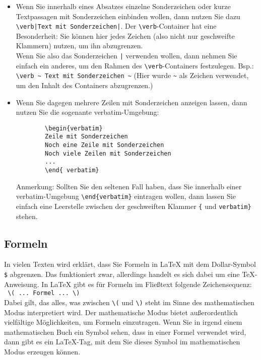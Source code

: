 \begin{itemize}
	\item Wenn Sie innerhalb eines Absatzes einzelne Sonderzeichen oder kurze Textpassagen mit Sonderzeichen einbinden wollen, dann nutzen Sie dazu \verb~\verb|Text mit Sonderzeichen|~. Der \verb|\verb|-Container hat eine Besonderheit: Sie können hier jedes Zeichen (also nicht nur geschweifte Klammern) nutzen, um ihn abzugrenzen.\\
	
	Wenn Sie also das Sonderzeichen \verb+|+ verwenden wollen, dann nehmen Sie einfach ein anderes, um den Rahmen des \verb|\verb|-Containers festzulegen. Bsp.: \verb|\verb ~ Text mit Sonderzeichen ~| (Hier wurde \verb|~| als Zeichen verwendet, um den Inhalt des Containers abzugrenzen.)
	
	\item Wenn Sie dagegen mehrere Zeilen mit Sonderzeichen anzeigen lassen, dann nutzen Sie die sogenante verbatim-Umgebung:
	
	\begin{verbatim}
		\begin{verbatim}
		Zeile mit Sonderzeichen
		Noch eine Zeile mit Sonderzeichen
		Noch viele Zeilen mit Sonderzeichen
		...
		\end{ verbatim}
	\end{verbatim}
	
	Anmerkung: Sollten Sie den seltenen Fall haben, dass Sie innerhalb einer verbatim-Umgebung \verb|\end{verbatim}| eintragen wollen, dann lassen Sie einfach eine Leerstelle zwischen der geschweiften Klammer \verb|{| und \verb|verbatim}| stehen.
\end{itemize}

\subsection{Formeln}

In vielen Texten wird erklärt, dass Sie Formeln in LaTeX mit dem Dollar-Symbol \verb|$| abgrenzen. Das funktioniert zwar, allerdings handelt es sich dabei um eine TeX-Anweisung. In LaTeX gibt es für Formeln im Fließtext folgende Zeichensequenz:\\

\verb| \( ... Formel ... \)|\\

Dabei gilt, das alles, was zwischen \verb|\(| und \verb|\)| steht im Sinne des mathematischen Modus interpretiert wird. Der mathematische Modus bietet außerordentlich vielfältige Möglichkeiten, um Formeln einzutragen. Wenn Sie in irgend einem mathematischen Buch ein Symbol sehen, dass in einer Formel verwendet wird, dann gibt es ein LaTeX-Tag, mit dem Sie dieses Symbol im mathematischen Modus erzeugen können.\\

